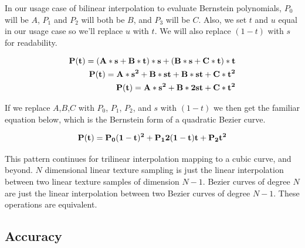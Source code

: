 \documentclass{jcgt}
\begin{document}
In our usage case of bilinear interpolation to evaluate Bernstein polynomials, $P_0$ will be $A$, $P_1$ and $P_2$ will both be $B$, and $P_3$ will be $C$.  Also, we set $t$ and $u$ equal in our usage case so we'll replace $u$ with $t$.  We will also replace $(1-t)$ with $s$ for readability.

\begin{equation}
\begin{split}
\bf{P(t)} = (A*s+B*t)*s + (B*s+C*t)*t \\
\bf{P(t)} = A*s^2+B*st + B*st+C*t^2 \\
\bf{P(t)} = A*s^2+B*2st+C*t^2
\end{split}
\label{eqn:bilinearinterpolation2}
\end{equation}

If we replace $A$,$B$,$C$ with $P_0$, $P_1$, $P_2$, and $s$ with $(1-t)$ we then get the familiar equation below, which is the Bernstein form of a quadratic Bezier curve.

\begin{equation}
\bf{P(t)} = P_0(1-t)^2+P_12(1-t)t+P_2t^2
\label{eqn:bilinearinterpolation3}
\end{equation}

This pattern continues for trilinear interpolation mapping to a cubic curve, and beyond.  $N$ dimensional linear texture sampling is just the linear interpolation between two linear texture samples of dimension $N-1$.  Bezier curves of degree $N$ are just the linear interpolation between two Bezier curves of degree $N-1$.  These operations are equivalent.

\subsection{Accuracy}
\end{document}
